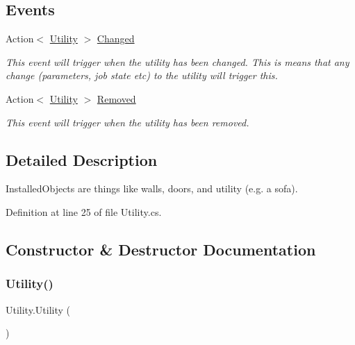 \subsection*{Events}
\begin{DoxyCompactItemize}
\item 
Action$<$ \hyperlink{class_utility}{Utility} $>$ \hyperlink{class_utility_ae0af28441e3bed8aa3529c9b5a3836cc}{Changed}
\begin{DoxyCompactList}\small\item\em This event will trigger when the utility has been changed. This is means that any change (parameters, job state etc) to the utility will trigger this. \end{DoxyCompactList}\item 
Action$<$ \hyperlink{class_utility}{Utility} $>$ \hyperlink{class_utility_ab1e23864eb68be882ac5acc52d26552a}{Removed}
\begin{DoxyCompactList}\small\item\em This event will trigger when the utility has been removed. \end{DoxyCompactList}\end{DoxyCompactItemize}


\subsection{Detailed Description}
Installed\+Objects are things like walls, doors, and utility (e.\+g. a sofa). 



Definition at line 25 of file Utility.\+cs.



\subsection{Constructor \& Destructor Documentation}
\mbox{\label{class_utility_a71a0ed20d9aac655319458fcb2012518}} 
\subsubsection{\texorpdfstring{Utility()}{Utility()}}
{\footnotesize\ttfamily Utility.\+Utility (\begin{DoxyParamCaption}{ }\end{DoxyParamCaption})}



